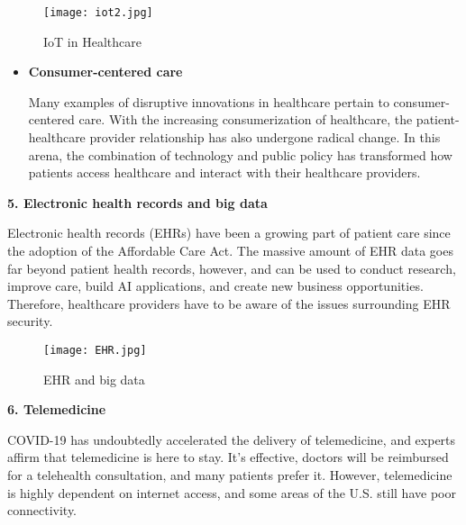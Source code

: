 \documentclass[12pt,a4paper]{article}
\begin{document}
 \hspace{5cm}
 
\begin{figure}[h]
\centering
\texttt{[image: iot2.jpg]}
\caption{IoT in Healthcare}
\end{figure}
 
\hspace{5cm}

\begin{itemize}
\item \textbf{Consumer-centered care}


Many examples of disruptive innovations in healthcare pertain to consumer-centered care. With the increasing consumerization of healthcare, the patient-healthcare provider relationship has also undergone radical change. In this arena, the combination of technology and public policy has transformed how patients access healthcare and interact with their healthcare providers.  
\end{itemize}

\clearpage

\textbf{5. Electronic health records and big data}

\hspace{1cm}
             
Electronic health records (EHRs) have been a growing part of patient care since the adoption of the Affordable Care Act. The massive amount of EHR data goes far beyond patient health records, however, and can be used to conduct research, improve care, build AI applications, and create new business opportunities. Therefore, healthcare providers have to be aware of the issues surrounding EHR security.

\hspace{5cm}


\begin{figure}[h]
\centering
\texttt{[image: EHR.jpg]}
\caption{EHR and big data}
\end{figure}

\clearpage

\textbf{6. Telemedicine}

\hspace{1cm}
          
COVID-19 has undoubtedly accelerated the delivery of telemedicine, and experts affirm that telemedicine is here to stay. It’s effective, doctors will be reimbursed for a telehealth consultation, and many patients prefer it. However, telemedicine is highly dependent on internet access, and some areas of the U.S. still have poor connectivity.
\end{document}
